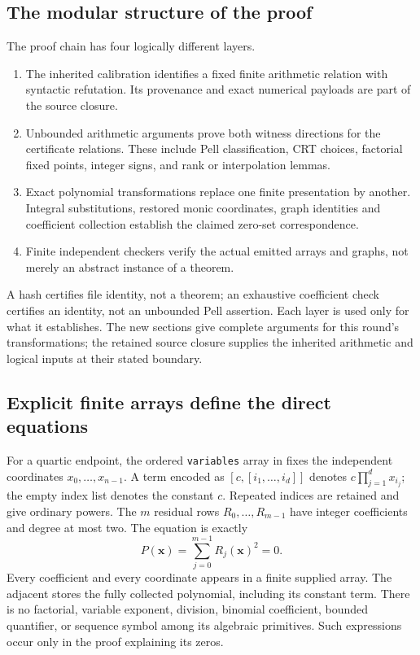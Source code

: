 \subsection{The modular structure of the proof}
The proof chain has four logically different layers.
\begin{enumerate}
\item The inherited calibration identifies a fixed finite arithmetic relation
with syntactic refutation. Its provenance and exact numerical payloads are
part of the source closure.
\item Unbounded arithmetic arguments prove both witness directions for the
certificate relations. These include Pell classification, CRT choices,
factorial fixed points, integer signs, and rank or interpolation lemmas.
\item Exact polynomial transformations replace one finite presentation by
another. Integral substitutions, restored monic coordinates, graph identities
and coefficient collection establish the claimed zero-set correspondence.
\item Finite independent checkers verify the actual emitted arrays and graphs,
not merely an abstract instance of a theorem.
\end{enumerate}
A hash certifies file identity, not a theorem; an exhaustive coefficient
check certifies an identity, not an unbounded Pell assertion. Each layer is
used only for what it establishes. The new sections give complete arguments
for this round's transformations; the retained source closure supplies
the inherited arithmetic and logical inputs at their stated boundary.

\subsection{Explicit finite arrays define the direct equations}
For a quartic endpoint, the ordered \texttt{variables} array in
 fixes the independent coordinates
$x_0,\ldots,x_{n-1}$. A term encoded as $[c,[i_1,\ldots,i_d]]$ denotes
$c\prod_{j=1}^{d}x_{i_j}$; the empty index list denotes the constant $c$.
Repeated indices are retained and give ordinary powers. The $m$ residual
rows $R_0,\ldots,R_{m-1}$ have integer coefficients and degree at most two.
The equation is exactly
\begin{equation}\label{eq:sos}
 P(\boldsymbol{x})=\sum_{j=0}^{m-1}R_j(\boldsymbol{x})^2=0.
\end{equation}
Every coefficient and every coordinate appears in a finite supplied array.
The adjacent  stores the fully collected
polynomial, including its constant term. There is no factorial, variable
exponent, division, binomial coefficient, bounded quantifier, or sequence
symbol among its algebraic primitives. Such expressions occur only in the
proof explaining its zeros.

